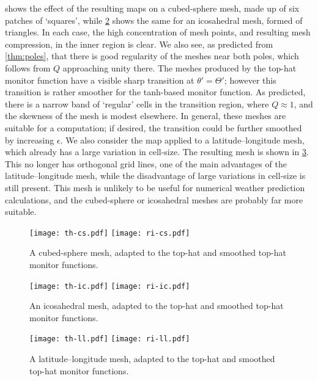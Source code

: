 \documentclass[11pt, a4paper]{scrartcl}  %
\theoremstyle{plain}
\theoremstyle{definition}
\numberwithin{equation}{section}
\begin{document}
 shows the effect of the resulting maps on a
cubed-sphere mesh, made up of six patches of `squares', while
\cref{fig:th-ic-meshes} shows the same for an icosahedral mesh, formed
of triangles. In each case, the high concentration of mesh points, and
resulting mesh compression, in the inner region is clear. We also see,
as predicted from \cref{thm:poles}, that there is good regularity of the
meshes near both poles, which follows from $Q$ approaching unity there.
The meshes produced by the top-hat monitor function have a visible sharp
transition at $\theta' = \Theta'$; however this transition is rather
smoother for the tanh-based monitor function. As predicted, there is a
narrow band of `regular' cells in the transition region, where
$Q \approx 1$, and the skewness of the mesh is modest elsewhere. In
general, these meshes are suitable for a computation; if desired, the
transition could be further smoothed by increasing $\epsilon$.
We also consider the map applied to a latitude--longitude mesh, which
already has a large variation in cell-size. The resulting mesh is shown
in \cref{fig:th-ll-meshes}. This no longer has orthogonal grid lines,
one of the main advantages of the latitude--longitude mesh, while the
disadvantage of large variations in cell-size is still present. This
mesh is unlikely to be useful for numerical weather prediction
calculations, and the cubed-sphere or icosahedral meshes are probably
far more suitable.

\begin{figure}[!tb]
  \centering
  \texttt{[image: th-cs.pdf]}
  \texttt{[image: ri-cs.pdf]}
  \caption{A cubed-sphere mesh, adapted to the top-hat and smoothed
top-hat monitor functions.}
\label{fig:th-cs-meshes}
\end{figure}

\begin{figure}[!tb]
  \centering
  \texttt{[image: th-ic.pdf]}
  \texttt{[image: ri-ic.pdf]}
  \caption{An icosahedral mesh, adapted to the top-hat and smoothed
top-hat monitor functions.}
\label{fig:th-ic-meshes}
\end{figure}

\begin{figure}[!tb]
  \centering
  \texttt{[image: th-ll.pdf]}
  \texttt{[image: ri-ll.pdf]}
  \caption{A latitude--longitude mesh, adapted to the top-hat and
smoothed top-hat monitor functions.}
\label{fig:th-ll-meshes}
\end{figure}
\end{document}
